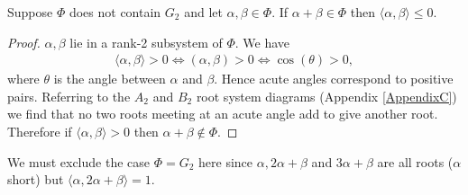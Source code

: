 \begin{lemma} \label{ufixes} Suppose $\Phi$ does not contain $G_2$ and let $\alpha,\beta\in\Phi$. If $\alpha + \beta \in \Phi$ then $\langle \alpha, \beta \rangle \leq 0$.
\end{lemma}
\begin{proof} $\alpha, \beta$ lie in a rank-2 subsystem of $\Phi$. We have
\begin{eqnarray*}
\langle \alpha, \beta \rangle > 0 \Longleftrightarrow (\alpha, \beta) >0 \Longleftrightarrow \cos(\theta) > 0,
\end{eqnarray*}
where $\theta$ is the angle between $\alpha$ and $\beta$. Hence acute angles correspond to positive pairs. Referring to the $A_2$ and $B_2$ root system diagrams (Appendix \ref{AppendixC}) we find that no two roots meeting at an acute angle add to give another root. Therefore if $\langle \alpha, \beta \rangle > 0$ then $\alpha + \beta \notin \Phi$.
\end{proof}

We must exclude the case $\Phi = G_2$ here since $\alpha, 2\alpha + \beta$ and $3\alpha + \beta$ are all roots ($\alpha$ short) but $\langle \alpha, 2\alpha + \beta \rangle = 1$.

